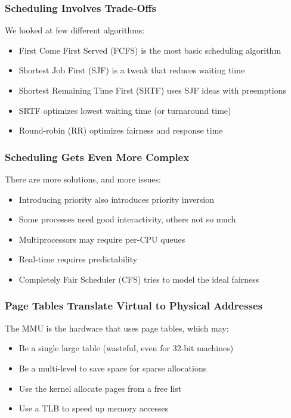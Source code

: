   \begin{frame}
    \frametitle{Scheduling Involves Trade-Offs}

    We looked at few different algorithms:
    \begin{itemize}
      \item First Come First Served (FCFS) is the most basic scheduling algorithm
      \item Shortest Job First (SJF) is a tweak that reduces waiting time
      \item Shortest Remaining Time First (SRTF) uses SJF ideas with preemptions
      \item SRTF optimizes lowest waiting time (or turnaround time)
      \item Round-robin (RR) optimizes fairness and response time
    \end{itemize}
  \end{frame}

  \begin{frame}
    \frametitle{Scheduling Gets Even More Complex}

    There are more solutions, and more issues:
    \begin{itemize}
      \item Introducing priority also introduces priority inversion
      \item Some processes need good interactivity, others not so much
      \item Multiprocessors may require per-CPU queues
      \item Real-time requires predictability
      \item Completely Fair Scheduler (CFS) tries to model the ideal fairness
    \end{itemize}
  \end{frame}

  \begin{frame}
    \frametitle{Page Tables Translate Virtual to Physical Addresses}

    The MMU is the hardware that uses page tables, which may:
    \begin{itemize}
      \item Be a single large table (wasteful, even for 32-bit machines)
      \item Be a multi-level to save space for sparse allocations
      \item Use the kernel allocate pages from a free list
      \item Use a TLB to speed up memory accesses
    \end{itemize}
  \end{frame}

